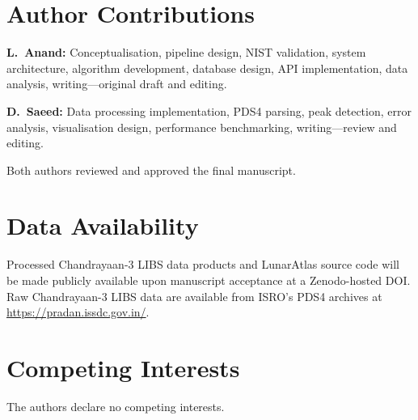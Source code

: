 \documentclass[a4paper,twocolumn,10pt]{article}
\begin{document}
\section*{Author Contributions}

\textbf{L.~Anand:} Conceptualisation, pipeline design, NIST validation,
system architecture, algorithm development, database design, API
implementation, data analysis, writing---original draft and editing.

\textbf{D.~Saeed:} Data processing implementation, PDS4 parsing, peak
detection, error analysis, visualisation design, performance
benchmarking, writing---review and editing.

Both authors reviewed and approved the final manuscript.

\section*{Data Availability}

Processed Chandrayaan-3 LIBS data products and LunarAtlas source code
will be made publicly available upon manuscript acceptance at a
Zenodo-hosted DOI. Raw Chandrayaan-3 LIBS data are available from
ISRO's PDS4 archives at \url{https://pradan.issdc.gov.in/}.

\section*{Competing Interests}

The authors declare no competing interests.
\end{document}
